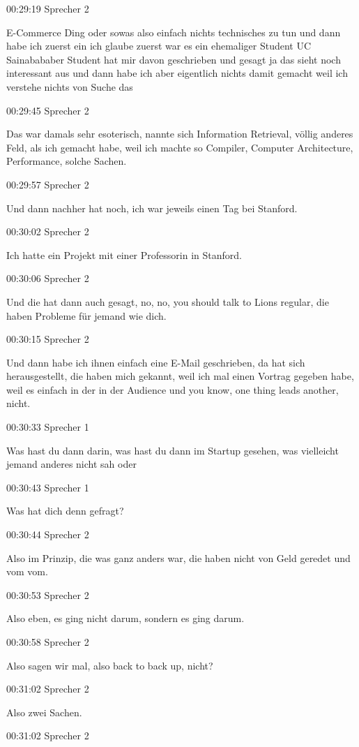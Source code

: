 00:29:19 Sprecher 2

E-Commerce Ding oder sowas also einfach nichts technisches zu tun und
dann habe ich zuerst ein ich glaube zuerst war es ein ehemaliger Student
UC Sainabababer Student hat mir davon geschrieben und gesagt ja das
sieht noch interessant aus und dann habe ich aber eigentlich nichts
damit gemacht weil ich verstehe nichts von Suche das

00:29:45 Sprecher 2

Das war damals sehr esoterisch, nannte sich Information Retrieval,
völlig anderes Feld, als ich gemacht habe, weil ich machte so Compiler,
Computer Architecture, Performance, solche Sachen.

00:29:57 Sprecher 2

Und dann nachher hat noch, ich war jeweils einen Tag bei Stanford.

00:30:02 Sprecher 2

Ich hatte ein Projekt mit einer Professorin in Stanford.

00:30:06 Sprecher 2

Und die hat dann auch gesagt, no, no, you should talk to Lions regular,
die haben Probleme für jemand wie dich.

00:30:15 Sprecher 2

Und dann habe ich ihnen einfach eine E-Mail geschrieben, da hat sich
herausgestellt, die haben mich gekannt, weil ich mal einen Vortrag
gegeben habe, weil es einfach in der in der Audience und you know, one
thing leads another, nicht.

00:30:33 Sprecher 1

Was hast du dann darin, was hast du dann im Startup gesehen, was
vielleicht jemand anderes nicht sah oder

00:30:43 Sprecher 1

Was hat dich denn gefragt?

00:30:44 Sprecher 2

Also im Prinzip, die was ganz anders war, die haben nicht von Geld
geredet und vom vom.

00:30:53 Sprecher 2

Also eben, es ging nicht darum, sondern es ging darum.

00:30:58 Sprecher 2

Also sagen wir mal, also back to back up, nicht?

00:31:02 Sprecher 2

Also zwei Sachen.

00:31:02 Sprecher 2

